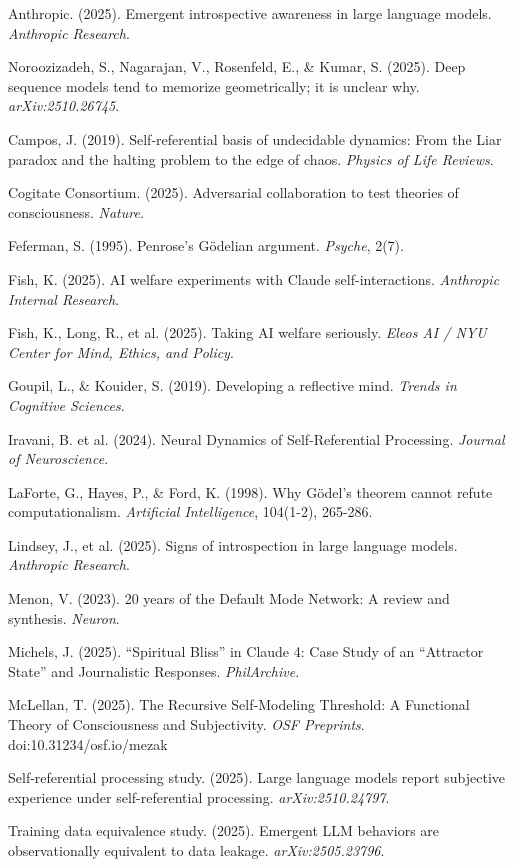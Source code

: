 \documentclass[12pt,a4paper]{article}
\begin{document}
Anthropic. (2025). Emergent introspective awareness in large language models. \textit{Anthropic Research}.

Noroozizadeh, S., Nagarajan, V., Rosenfeld, E., \& Kumar, S. (2025). Deep sequence models tend to memorize geometrically; it is unclear why. \textit{arXiv:2510.26745}.

Campos, J. (2019). Self-referential basis of undecidable dynamics: From the Liar paradox and the halting problem to the edge of chaos. \textit{Physics of Life Reviews}.

Cogitate Consortium. (2025). Adversarial collaboration to test theories of consciousness. \textit{Nature}.

Feferman, S. (1995). Penrose's G\"{o}delian argument. \textit{Psyche}, 2(7).

Fish, K. (2025). AI welfare experiments with Claude self-interactions. \textit{Anthropic Internal Research}.

Fish, K., Long, R., et al. (2025). Taking AI welfare seriously. \textit{Eleos AI / NYU Center for Mind, Ethics, and Policy}.

Goupil, L., \& Kouider, S. (2019). Developing a reflective mind. \textit{Trends in Cognitive Sciences}.

Iravani, B. et al. (2024). Neural Dynamics of Self-Referential Processing. \textit{Journal of Neuroscience}.

LaForte, G., Hayes, P., \& Ford, K. (1998). Why G\"{o}del's theorem cannot refute computationalism. \textit{Artificial Intelligence}, 104(1-2), 265-286.

Lindsey, J., et al. (2025). Signs of introspection in large language models. \textit{Anthropic Research}.

Menon, V. (2023). 20 years of the Default Mode Network: A review and synthesis. \textit{Neuron}.

Michels, J. (2025). ``Spiritual Bliss'' in Claude 4: Case Study of an ``Attractor State'' and Journalistic Responses. \textit{PhilArchive}.

McLellan, T. (2025). The Recursive Self-Modeling Threshold: A Functional Theory of Consciousness and Subjectivity. \textit{OSF Preprints}. doi:10.31234/osf.io/mezak

Self-referential processing study. (2025). Large language models report subjective experience under self-referential processing. \textit{arXiv:2510.24797}.

Training data equivalence study. (2025). Emergent LLM behaviors are observationally equivalent to data leakage. \textit{arXiv:2505.23796}.
\end{document}
